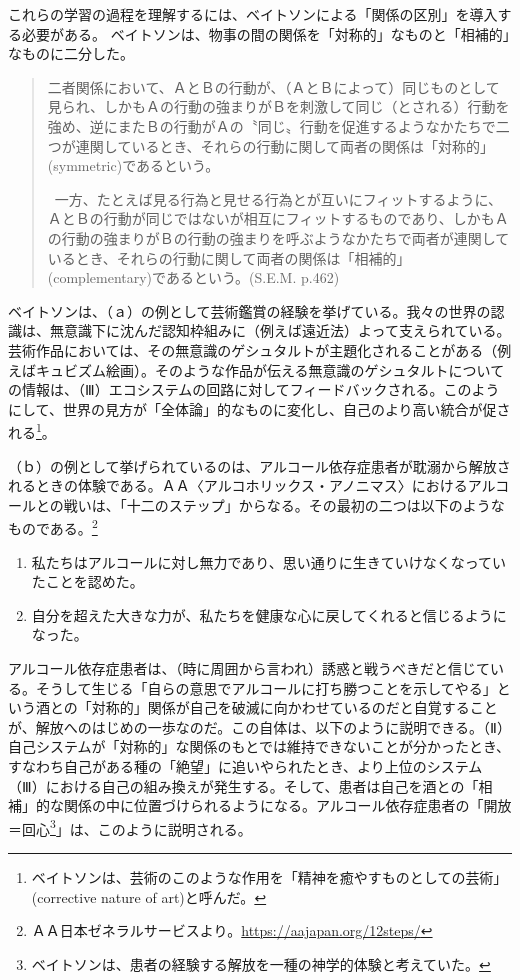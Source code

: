 \documentclass[9pt,b5j,twoside,twocolumn]{utarticle}
\begin{document}
これらの学習の過程を理解するには、ベイトソンによる「関係の区別」を導入する必要がある。
ベイトソンは、物事の間の関係を「対称的」なものと「相補的」なものに二分した。
\begin{quote}
二者関係において、ＡとＢの行動が、（ＡとＢによって）同じものとして見られ、しかもＡの行動の強まりがＢを刺激して同じ（とされる）行動を強め、逆にまたＢの行動がＡの〝同じ〟行動を促進するようなかたちで二つが連関しているとき、それらの行動に関して両者の関係は「対称的」(symmetric)であるという。


~一方、たとえば見る行為と見せる行為とが互いにフィットするように、ＡとＢの行動が同じではないが相互にフィットするものであり、しかもＡの行動の強まりがＢの行動の強まりを呼ぶようなかたちで両者が連関しているとき、それらの行動に関して両者の関係は「相補的」(complementary)であるという。(S.E.M. p.462)
\end{quote}


ベイトソンは、（ａ）の例として芸術鑑賞の経験を挙げている。我々の世界の認識は、無意識下に沈んだ認知枠組みに（例えば遠近法）よって支えられている。芸術作品においては、その無意識のゲシュタルトが主題化されることがある（例えばキュビズム絵画）。そのような作品が伝える無意識のゲシュタルトについての情報は、（Ⅲ）エコシステムの回路に対してフィードバックされる。このようにして、世界の見方が「全体論」的なものに変化し、自己のより高い統合が促される\footnote{ベイトソンは、芸術のこのような作用を「精神を癒やすものとしての芸術」(corrective nature of art)と呼んだ。}。


（ｂ）の例として挙げられているのは、アルコール依存症患者が耽溺から解放されるときの体験である。ＡＡ〈アルコホリックス・アノニマス〉におけるアルコールとの戦いは、「十二のステップ」からなる。その最初の二つは以下のようなものである。\footnote{ＡＡ日本ゼネラルサービスより。\url{https://aajapan.org/12steps/}}
\begin{enumerate}
\setlength{\itemsep}{-2mm} 
\item 私たちはアルコールに対し無力であり、思い通りに生きていけなくなっていたことを認めた。
\item 自分を超えた大きな力が、私たちを健康な心に戻してくれると信じるようになった。
\end{enumerate}

アルコール依存症患者は、（時に周囲から言われ）誘惑と戦うべきだと信じている。そうして生じる「自らの意思でアルコールに打ち勝つことを示してやる」という酒との「対称的」関係が自己を破滅に向かわせているのだと自覚することが、解放へのはじめの一歩なのだ。この自体は、以下のように説明できる。（Ⅱ）自己システムが「対称的」な関係のもとでは維持できないことが分かったとき、すなわち自己がある種の「絶望」に追いやられたとき、より上位のシステム（Ⅲ）における自己の組み換えが発生する。そして、患者は自己を酒との「相補」的な関係の中に位置づけられるようになる。アルコール依存症患者の「開放＝回心\footnote{ベイトソンは、患者の経験する解放を一種の神学的体験と考えていた。}」は、このように説明される。
\end{document}
